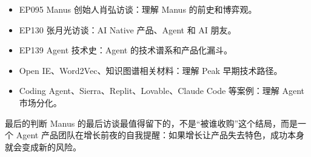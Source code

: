 \documentclass[a4paper]{article}
\begin{document}
\begin{itemize}
\item EP095 Manus 创始人肖弘访谈：理解 Manus 的前史和博弈观。
\item EP130 张月光访谈：AI Native 产品、Agent 和 AI 朋友。
\item EP139 Agent 技术史：Agent 的技术谱系和产品化漏斗。
\item Open IE、Word2Vec、知识图谱相关材料：理解 Peak 早期技术路径。
\item Coding Agent、Sierra、Replit、Lovable、Claude Code 等案例：理解 Agent 市场分化。
\end{itemize}

\begin{importantbox}{最后的判断}
Manus 的最后访谈最值得留下的，不是“被谁收购”这个结局，而是一个 Agent 产品团队在增长前夜的自我提醒：如果增长让产品失去特色，成功本身就会变成新的风险。
\end{importantbox}
\end{document}
